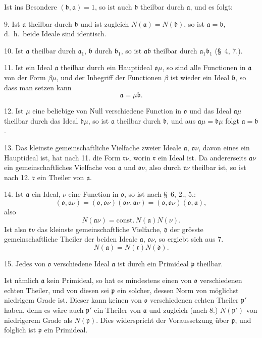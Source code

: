 \documentclass{article}
\begin{document}
Ist ins Besondere $(\mathfrak{b}, \mathfrak{a}) = 1$, so ist auch $\mathfrak{b}$ theilbar durch $\mathfrak{a}$, und es folgt:

9. Ist $\mathfrak{a}$ theilbar durch $\mathfrak{b}$ und ist zugleich $N(\mathfrak{a}) = N(\mathfrak{b})$, so ist $\mathfrak{a} = \mathfrak{b}$, d.\ h.\ beide Ideale sind identisch.

10. Ist $\mathfrak{a}$ theilbar durch $\mathfrak{a}_{1}$, $\mathfrak{b}$ durch $\mathfrak{b}_{1}$, so ist $\mathfrak{a}\mathfrak{b}$ theilbar durch $\mathfrak{a}_{1}\mathfrak{b}_{1}$ (§~4, 7.).


11. Ist ein Ideal $\mathfrak{a}$ theilbar durch ein Hauptideal $\mathfrak{o}\mu$, so sind alle Functionen in $\mathfrak{a}$ von der Form $\beta\mu$, und der Inbegriff der Functionen $\beta$ ist wieder ein Ideal $\mathfrak{b}$, so dass man setzen kann
\[ \mathfrak{a} = \mu\mathfrak{b}. \]

12. Ist $\mu$ eine beliebige von Null verschiedene Function in $\mathfrak{o}$ und das Ideal $\mathfrak{a}\mu$ theilbar durch das Ideal $\mathfrak{b}\mu$, so ist $\mathfrak{a}$ theilbar durch $\mathfrak{b}$, und aus $\mathfrak{a}\mu = \mathfrak{b}\mu$ folgt $\mathfrak{a} = \mathfrak{b}$.

13. Das kleinste gemeinschaftliche Vielfache zweier Ideale $\mathfrak{a}$, $\mathfrak{o}\nu$, davon eines ein Hauptideal ist, hat nach 11. die Form $\mathfrak{r}\nu$, worin $\mathfrak{r}$ ein Ideal ist. Da andererseits $\mathfrak{a}\nu$ ein gemeinschaftliches Vielfache von $\mathfrak{a}$ und $\mathfrak{o}\nu$, also durch $\mathfrak{r}\nu$ theilbar ist, so ist nach 12. $\mathfrak{r}$ ein Theiler von $\mathfrak{a}$.

14. Ist $\mathfrak{a}$ ein Ideal, $\nu$ eine Function in $\mathfrak{o}$, so ist nach §~6, 2., 5.:
\[ (\mathfrak{o}, \mathfrak{a}\nu) = (\mathfrak{o}, \mathfrak{o}\nu)(\mathfrak{o}\nu, \mathfrak{a}\nu) = (\mathfrak{o}, \mathfrak{o}\nu)(\mathfrak{o}, \mathfrak{a}), \]
also
\[ N(\mathfrak{a}\nu) = \text{const.}\,N(\mathfrak{a})N(\nu). \]
Ist also $\mathfrak{r}\nu$ das kleinste gemeinschaftliche Vielfache, $\mathfrak{d}$ der grösste gemeinschaftliche Theiler der beiden Ideale $\mathfrak{a}$, $\mathfrak{o}\nu$, so ergiebt sich aus 7.
\[ N(\mathfrak{a}) = N(\mathfrak{r})N(\mathfrak{d}). \]

15. Jedes von $\mathfrak{o}$ verschiedene Ideal $\mathfrak{a}$ ist durch ein Primideal $\mathfrak{p}$ theilbar.

Ist nämlich $\mathfrak{a}$ kein Primideal, so hat es mindestens einen von $\mathfrak{o}$ verschiedenen echten Theiler, und von diesen sei $\mathfrak{p}$ ein solcher, dessen Norm von möglichst niedrigem Grade ist. Dieser kann keinen von $\mathfrak{o}$ verschiedenen echten Theiler $\mathfrak{p}'$ haben, denn es wäre auch $\mathfrak{p}'$ ein Theiler von $\mathfrak{a}$ und zugleich (nach 8.) $N(\mathfrak{p}')$ von niedrigerem Grade als $N(\mathfrak{p})$. Dies widerspricht der Voraussetzung über $\mathfrak{p}$, und folglich ist $\mathfrak{p}$ ein Primideal.
\end{document}
